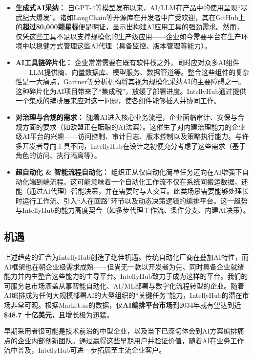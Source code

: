 \documentclass[11pt, a4paper, oneside]{article}
\begin{document}
\begin{itemize}
    \item \textbf{生成式AI采纳：} 自GPT-4等模型发布以来，AI/LLM在产品中的使用呈现“寒武纪大爆发”。诸如LangChain等开源库在开发者中广受欢迎，其在GitHub上的\textbf{超过80,000颗星标}\cite{langchainGitHub}便是明证，显示出构建AI应用工具的强劲需求。然而，仅凭这些工具不足以支撑规模化的生产级应用——企业如今需要平台在生产环境中以稳健方式管理这些AI代理（具备监控、版本管理等能力）。 
    
    \item \textbf{AI工具链碎片化：} 企业常常需要在既有软件栈之外，同时应对众多AI组件——LLM提供商、向量数据库、模型服务、数据管道等。整合这些组件的复杂性是一大痛点，Gartner等分析机构将其视为规模化采纳AI的主要障碍之一\cite{gartnerAIBarriers}。这种碎片化为AI项目带来了“集成税”，放缓了部署进度。IntellyHub通过提供一个集成的编排层来应对这一问题，使各组件能够插入并协同工作。
    
    \item \textbf{对治理与合规的需求：} 随着AI进入核心业务流程，企业面临审计、安保与合规方面的要求（如欧盟正在酝酿的AI法案\cite{euAIAct}）。这催生了对内建治理能力的企业级AI平台的兴趣——访问控制、审计日志、版本控制以及策略执行能力。与许多开发者导向工具不同，IntellyHub在设计之初便充分考虑了这些需求（基于角色的访问、执行隔离等）。
    
    \item \textbf{超自动化 \& 智能流程自动化：} 组织正从仅自动化简单任务迈向在AI增强下自动化端到端流程。这可能意味着一个自动化工作流不仅在系统间搬运数据，还能（通过AI代理）智能决策，并在需要时与人交互。此类场景需要能够处理长时运行工作流、引入“人在回路”环节以及动态决策逻辑的编排平台。这一趋势与IntellyHub的能力高度契合（如多步代理工作流、条件分支、内建AI决策）。
\end{itemize}

\subsection{机遇}
上述趋势的汇合为IntellyHub创造了绝佳机遇。传统自动化厂商在叠加AI特性，而AI框架也在朝企业级需求成熟——但尚无一款以开发者为先、同时具备企业就绪能力并内生整合这些能力的主导平台。IntellyHub致力于成为这样的平台。我们的可服务总市场涵盖从事智能自动化、AI/ML部署与数字化流程转型的企业。随着AI编排成为任何大规模部署AI的大型组织的“关键任务”能力，IntellyHub的潜在市场非常可观。根据Market.us的数据，仅\textbf{AI编排平台市场}到2034年就有望达到近\textbf{\$48.7 十亿美元}\cite{AIOrch}，且增长极为迅猛。 

早期采用者很可能是技术前沿的中型企业，以及当下已深切体会到AI方案编排痛点的企业内部创新团队。通过赢得这些早期用户并验证价值，随着AI在业务工作流中普及，IntellyHub可进一步拓展至主流企业客户。
\end{document}
